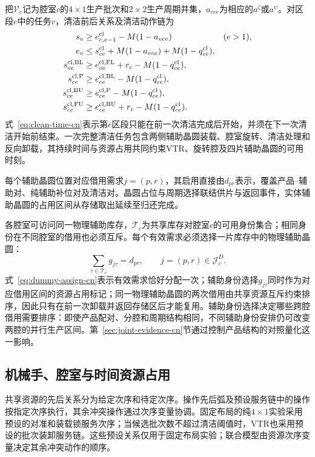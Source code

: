 \documentclass[final,5p,times,twocolumn]{elsarticle}
\begin{document}
把$\mathcal V_c$记为腔室$c$的$4\times1$生产批次和$2\times2$生产周期并集，$a_{vce}$为相应的$a^{\zeta}$或$a^{\psi}$。对区段$e$中的任务$v$，清洁前后关系及清洁动作链为
\begin{equation}
\begin{aligned}
s_v&\ge e^{\rm cl}_{c,e-1}-M(1-a_{vce}) &&(e>1),\\
e_v&\le s^{\rm cl}_{ce}+M(1-a_{vce})+M(1-q^{\rm cl}_{ce}),\\
s^{\rm cl,BL}_{ce}&\ge e^{\rm cl,FL}_{ce}+r_c-M(1-q^{\rm cl}_{ce}),\\
s^{\rm cl,P}_{ce}&\ge e^{\rm cl,BL}_{ce}-M(1-q^{\rm cl}_{ce}),\\
s^{\rm cl,BU}_{ce}&\ge e^{\rm cl,P}_{ce}-M(1-q^{\rm cl}_{ce}),\\
s^{\rm cl,FU}_{ce}&\ge e^{\rm cl,BU}_{ce}+r_c-M(1-q^{\rm cl}_{ce}).
\end{aligned}
\label{eq:clean-time-cn}
\end{equation}
式~\eqref{eq:clean-time-cn}表示第$e$区段只能在前一次清洁完成后开始，并须在下一次清洁开始前结束。一次完整清洁任务包含两侧辅助晶圆装载、腔室旋转、清洁处理和反向卸载，其持续时间与资源占用共同约束VTR、旋转腔及四片辅助晶圆的可用时刻。

每个辅助晶圆位置对应借用需求$j=(p,r)$，其启用直接由$d_{pr}$表示，覆盖产品--辅助对、纯辅助补位对及清洁对。晶圆占位与周期选择联结供片与返回事件，实体辅助晶圆的占用区间从存储取出延续至归还完成。

各腔室可访问同一物理辅助库存，$\mathcal T_c$为共享库存对腔室$c$的可用身份集合；相同身份在不同腔室的借用也必须互斥。每个有效需求必须选择一片库存中的物理辅助晶圆：
\begin{equation}
\sum_{\tau\in\mathcal T_c}g_{j\tau}=d_{pr},
\qquad j=(p,r)\in\mathcal J_c^D.
\label{eq:dummy-assign-cn}
\end{equation}
式~\eqref{eq:dummy-assign-cn}表示有效需求恰好分配一次；辅助身份选择$g_{j\tau}$同时作为对应借用区间的资源占用标记；同一物理辅助晶圆的两次借用由共享资源互斥约束排序，因此只有在前一次卸载并返回存储区后才能复用。辅助身份选择决定哪些跨腔借用需要排序：即使产品配对、分腔和周期结构相同，不同辅助身份安排仍可改变两腔的并行生产区间。第~\ref{sec:joint-evidence-cn}节通过控制产品结构的对照量化这一影响。

\subsection{机械手、腔室与时间资源占用}

共享资源的先后关系分为给定次序和待定次序。操作先后弧及预设服务链中的操作按指定次序执行，其余冲突操作通过次序变量协调。固定布局的纯$4\times1$实验采用预设的对准和装载锁服务次序；当候选批次数不超过清洁阈值时，VTR也采用预设的批次装卸服务链。这些预设关系仅用于固定布局实验；联合模型由资源次序变量决定其余冲突动作的顺序。
\end{document}

